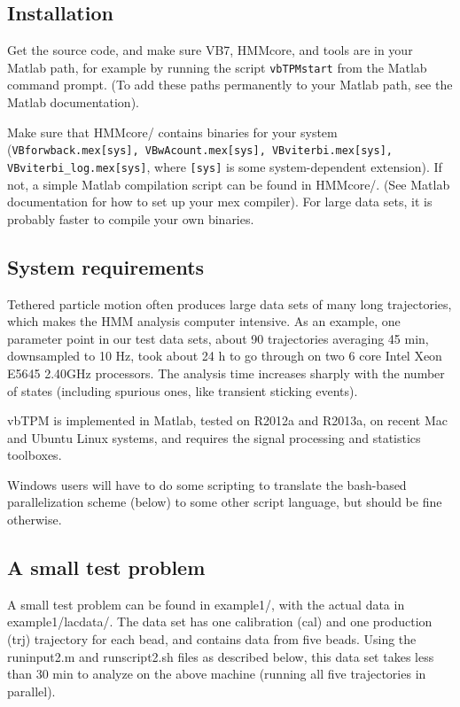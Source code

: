 \subsection{Installation}
Get the source code, and make sure VB7, HMMcore, and tools are in your
Matlab path, for example by running the script \verb+vbTPMstart+ from
the Matlab command prompt. (To add these paths permanently to your
Matlab path, see the Matlab documentation).

Make sure that HMMcore/ contains binaries for your system
(\texttt{VBforwback.mex[sys], VBwAcount.mex[sys], VBviterbi.mex[sys],
  VBviterbi\_log.mex[sys]}, where \texttt{[sys]} is some
system-dependent extension). If not, a simple Matlab compilation
script can be found in HMMcore/. (See Matlab documentation for how to
set up your mex compiler). For large data sets, it is probably faster
to compile your own binaries.

\subsection{System requirements}
Tethered particle motion often produces large data sets of many long
trajectories, which makes the HMM analysis computer intensive. As an
example, one parameter point in our test data sets, about 90
trajectories averaging 45 min, downsampled to 10 Hz, took about 24 h
to go through on two 6 core Intel Xeon E5645 2.40GHz processors. The
analysis time increases sharply with the number of states (including
spurious ones, like transient sticking events).

vbTPM is implemented in Matlab, tested on R2012a and R2013a, on recent
Mac and Ubuntu Linux systems, and requires the signal processing and
statistics toolboxes.

Windows users will have to do some scripting to translate the
bash-based parallelization scheme (below) to some other script
language, but should be fine otherwise.

\subsection{A small test problem}
A small test problem can be found in example1/, with the actual data
in example1/lacdata/.  The data set has one calibration (cal) and one
production (trj) trajectory for each bead, and contains data from five
beads. Using the runinput2.m and runscript2.sh files as described
below, this data set takes less than 30 min to analyze on the above
machine (running all five trajectories in parallel).

